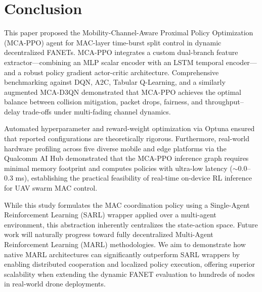 
\section{Conclusion}
\label{sec:conclusion}

This paper proposed the Mobility-Channel-Aware Proximal Policy Optimization (MCA-PPO) agent for MAC-layer time-burst split control in dynamic decentralized FANETs. MCA-PPO integrates a custom dual-branch feature extractor---combining an MLP scalar encoder with an LSTM temporal encoder---and a robust policy gradient actor-critic architecture. Comprehensive benchmarking against DQN, A2C, Tabular Q-Learning, and a similarly augmented MCA-D3QN demonstrated that MCA-PPO achieves the optimal balance between collision mitigation, packet drops, fairness, and throughput--delay trade-offs under multi-fading channel dynamics.

Automated hyperparameter and reward-weight optimization via Optuna ensured that reported configurations are theoretically rigorous. Furthermore, real-world hardware profiling across five diverse mobile and edge platforms via the Qualcomm AI Hub demonstrated that the MCA-PPO inference graph requires minimal memory footprint and computes policies with ultra-low latency ($\sim$0.0--0.3 ms), establishing the practical feasibility of real-time on-device RL inference for UAV swarm MAC control.

While this study formulates the MAC coordination policy using a Single-Agent Reinforcement Learning (SARL) wrapper applied over a multi-agent environment, this abstraction inherently centralizes the state-action space. Future work will naturally progress toward fully decentralized Multi-Agent Reinforcement Learning (MARL) methodologies. We aim to demonstrate how native MARL architectures can significantly outperform SARL wrappers by enabling distributed cooperation and localized policy execution, offering superior scalability when extending the dynamic FANET evaluation to hundreds of nodes in real-world drone deployments.
